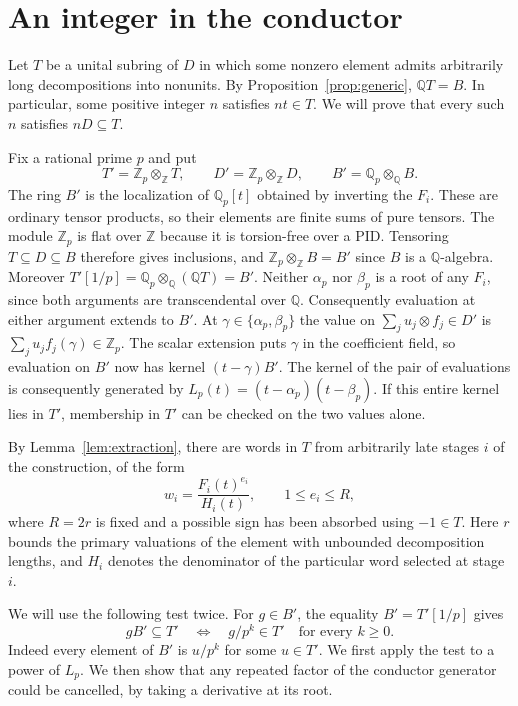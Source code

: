 \section{An integer in the conductor}
\label{sec:conductor}

Let $T$ be a unital subring of $D$ in which some nonzero element admits arbitrarily long decompositions into nonunits.
By Proposition~\ref{prop:generic}, $\mathbb{Q}T = B$.
In particular, some positive integer $n$ satisfies $nt \in T$.
We will prove that every such $n$ satisfies $nD \subseteq T$.

Fix a rational prime $p$ and put
\[
    T' = \mathbb{Z}_p \otimes_{\mathbb{Z}} T,
    \qquad
    D' = \mathbb{Z}_p \otimes_{\mathbb{Z}} D,
    \qquad
    B' = \mathbb{Q}_p \otimes_{\mathbb{Q}} B.
\]
The ring $B'$ is the localization of $\mathbb{Q}_p[t]$ obtained by inverting the $F_i$.
These are ordinary tensor products, so their elements are finite sums of pure tensors.
The module $\mathbb{Z}_p$ is flat over $\mathbb{Z}$ because it is torsion-free over a PID.
Tensoring $T \subseteq D \subseteq B$ therefore gives inclusions, and $\mathbb{Z}_p \otimes_{\mathbb{Z}} B = B'$ since $B$ is a $\mathbb{Q}$-algebra.
Moreover $T'[1/p] = \mathbb{Q}_p \otimes_{\mathbb{Q}} (\mathbb{Q}T) = B'$.
Neither $\alpha_p$ nor $\beta_p$ is a root of any $F_i$, since both arguments are transcendental over $\mathbb{Q}$.
Consequently evaluation at either argument extends to $B'$.
At $\gamma \in \{\alpha_p, \beta_p\}$ the value on $\sum_j u_j \otimes f_j \in D'$ is $\sum_j u_j f_j(\gamma) \in \mathbb{Z}_p$.
The scalar extension puts $\gamma$ in the coefficient field, so evaluation on $B'$ now has kernel $(t - \gamma)B'$.
The kernel of the pair of evaluations is consequently generated by $L_p(t) = (t - \alpha_p)(t - \beta_p)$.
If this entire kernel lies in $T'$, membership in $T'$ can be checked on the two values alone.

By Lemma~\ref{lem:extraction}, there are words in $T$ from arbitrarily late stages $i$ of the construction, of the form
\[
    w_i = \frac{F_i(t)^{e_i}}{H_i(t)},
    \qquad 1 \le e_i \le R,
\]
where $R = 2r$ is fixed and a possible sign has been absorbed using $-1 \in T$.
Here $r$ bounds the primary valuations of the element with unbounded decomposition lengths, and $H_i$ denotes the denominator of the particular word selected at stage $i$.

We will use the following test twice.
For $g \in B'$, the equality $B' = T'[1/p]$ gives
\[
    g B' \subseteq T'
    \quad\Longleftrightarrow\quad
    g/p^k \in T' \quad\text{for every } k \ge 0.
\]
Indeed every element of $B'$ is $u/p^k$ for some $u \in T'$.
We first apply the test to a power of $L_p$.
We then show that any repeated factor of the conductor generator could be cancelled, by taking a derivative at its root.


